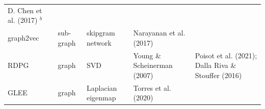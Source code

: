\documentclass[11pt]{article}
\begin{document}
\begin{longtable}[]{@{}lllll@{}}
\begin{minipage}[t]{0.29\columnwidth}
D. Chen et al. (2017) \(^b\)\strut
\end{minipage}\tabularnewline
\begin{minipage}[t]{0.09\columnwidth}\raggedright
graph2vec\strut
\end{minipage} & \begin{minipage}[t]{0.11\columnwidth}\raggedright
sub-graph\strut
\end{minipage} & \begin{minipage}[t]{0.23\columnwidth}\raggedright
skipgram network\strut
\end{minipage} & \begin{minipage}[t]{0.14\columnwidth}\raggedright
Narayanan et al. (2017)\strut
\end{minipage} & \begin{minipage}[t]{0.29\columnwidth}\raggedright
\strut
\end{minipage}\tabularnewline
\begin{minipage}[t]{0.09\columnwidth}\raggedright
RDPG\strut
\end{minipage} & \begin{minipage}[t]{0.11\columnwidth}\raggedright
graph\strut
\end{minipage} & \begin{minipage}[t]{0.23\columnwidth}\raggedright
SVD\strut
\end{minipage} & \begin{minipage}[t]{0.14\columnwidth}\raggedright
Young \& Scheinerman (2007)\strut
\end{minipage} & \begin{minipage}[t]{0.29\columnwidth}\raggedright
Poisot et al. (2021); Dalla Riva \& Stouffer (2016)\strut
\end{minipage}\tabularnewline
\begin{minipage}[t]{0.09\columnwidth}\raggedright
GLEE\strut
\end{minipage} & \begin{minipage}[t]{0.11\columnwidth}\raggedright
graph\strut
\end{minipage} & \begin{minipage}[t]{0.23\columnwidth}\raggedright
Laplacian eigenmap\strut
\end{minipage} & \begin{minipage}[t]{0.14\columnwidth}\raggedright
Torres et al. (2020)\strut
\end{minipage} & \begin{minipage}[t]{0.29\columnwidth}\raggedright
\strut
\end{minipage}\tabularnewline

\end{longtable}
\end{document}
